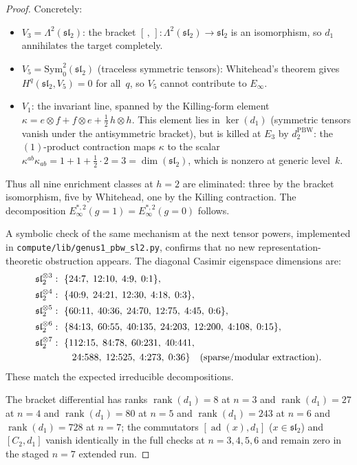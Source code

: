 \begin{proof}
Concretely:
\begin{itemize}
\item $V_3 = \Lambda^2(\mathfrak{sl}_2)$: the bracket
  $[\,,\,]\colon \Lambda^2(\mathfrak{sl}_2)
  \to \mathfrak{sl}_2$ is an isomorphism,
  so $d_1$ annihilates the target completely.
\item $V_5 = \mathrm{Sym}^2_0(\mathfrak{sl}_2)$
  (traceless symmetric tensors):
  Whitehead's theorem gives
  $H^q(\mathfrak{sl}_2, V_5) = 0$ for all~$q$, so $V_5$
  cannot contribute to $E_\infty$.
\item $V_1$: the invariant line, spanned by the
  Killing-form element
  $\kappa = e \otimes f + f \otimes e
  + \tfrac{1}{2}\,h \otimes h$.
  This element lies in $\ker(d_1)$ (symmetric tensors
  vanish under the antisymmetric bracket), but is killed
  at $E_3$ by $d_2^{\mathrm{PBW}}$: the $(1)$-product
  contraction maps $\kappa$ to the scalar
  $\kappa^{ab}\kappa_{ab} = 1 + 1 + \tfrac{1}{2} \cdot 2
  = 3 = \dim(\mathfrak{sl}_2)$,
  which is nonzero at generic level~$k$.
\end{itemize}

Thus all nine enrichment classes at $h = 2$ are eliminated:
three by the bracket isomorphism, five by Whitehead, one by the
Killing contraction.
The decomposition $E_\infty^{*,2}(g{=}1) =
E_\infty^{*,2}(g{=}0)$ follows.

A symbolic check of the same mechanism at the next tensor
powers, implemented in
\nolinkurl{compute/lib/genus1_pbw_sl2.py},
confirms that no new representation-theoretic obstruction
appears.  The diagonal Casimir eigenspace dimensions are:
\[
\begin{aligned}
\mathfrak{sl}_2^{\otimes 3}&:\ \{24{:}7,\;12{:}10,\;4{:}9,\;0{:}1\},\\
\mathfrak{sl}_2^{\otimes 4}&:\ \{40{:}9,\;24{:}21,\;12{:}30,\;4{:}18,\;0{:}3\},\\
\mathfrak{sl}_2^{\otimes 5}&:\ \{60{:}11,\;40{:}36,\;24{:}70,\;12{:}75,\;4{:}45,\;0{:}6\},\\
\mathfrak{sl}_2^{\otimes 6}&:\ \{84{:}13,\;60{:}55,\;40{:}135,\;24{:}203,\;12{:}200,\;4{:}108,\;0{:}15\},\\
\mathfrak{sl}_2^{\otimes 7}&:\ \{112{:}15,\;84{:}78,\;60{:}231,\;40{:}441,\\
&\qquad 24{:}588,\;12{:}525,\;4{:}273,\;0{:}36\}
\quad\textup{(sparse/modular extraction).}
\end{aligned}
\]
These match the expected irreducible decompositions.

The bracket differential has ranks
$\operatorname{rank}(d_1)=8$ at $n=3$ and
$\operatorname{rank}(d_1)=27$ at $n=4$ and
$\operatorname{rank}(d_1)=80$ at $n=5$ and
$\operatorname{rank}(d_1)=243$ at $n=6$ and
$\operatorname{rank}(d_1)=728$ at $n=7$; the commutators
$[\operatorname{ad}(x), d_1]$ ($x \in \mathfrak{sl}_2$) and
$[C_2, d_1]$ vanish identically in the full checks at
$n=3,4,5,6$ and remain zero in the staged $n=7$ extended run.


\end{proof}
